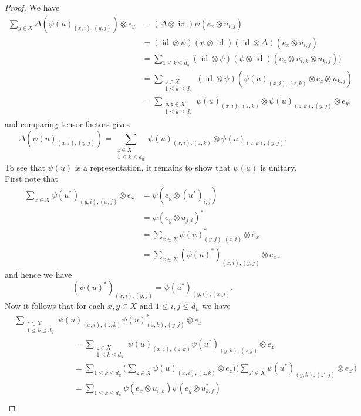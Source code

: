 \documentclass[10pt,a4paper]{amsart}
\def\id{\operatorname{id}}
\begin{document}
\begin{proof}
	We have
	\begin{align*}
		\sum_{y\in X} \Delta(\psi(u)_{(x,i),(y,j)}) \otimes e_y &= (\Delta\otimes\id)\psi(e_x\otimes u_{i,j}) \\
		&= (\id\otimes\psi)(\psi\otimes\id)(\id\otimes\Delta)(e_x\otimes u_{i,j}) \\
		&= \sum_{1\le k\le d_u}(\id\otimes\psi)(\psi\otimes\id)(e_x\otimes u_{i,k}\otimes u_{k,j})) \\
		&= \sum_{\substack{z\in X\\ 1\le k\le d_u}} (\id\otimes\psi)(\psi(u)_{(x,i),(z,k)}\otimes e_z \otimes u_{k,j}) \\
		&= \sum_{\substack{y,z\in X\\ 1\le k\le d_u}}\psi(u)_{(x,i),(z,k)} \otimes \psi(u)_{(z,k),(y,j)} \otimes e_y,
	\end{align*}
	and comparing tensor factors gives 
	\[
	\Delta(\psi(u)_{(x,i),(y,j)}) = \sum_{\substack{z\in X\\ 1\le k\le d_u}} \psi(u)_{(x,i),(z,k)} \otimes \psi(u)_{(z,k),(y,j)}.
	\]
	To see that $\psi(u)$ is a representation, it remains to show that $\psi(u)$ is unitary. First note that 
	\begin{align*}
		\sum_{x\in X}\psi(u^*)_{(y,i),(x,j)}\otimes e_x &= \psi(e_y\otimes (u^*)_{i,j})\\
		&=\psi(e_y\otimes u_{j,i})^*\\
		&=\sum_{x\in X}\psi(u)_{(y,j),(x,i)}^*\otimes e_x\\
		&=\sum_{x\in X}(\psi(u)^*)_{(x,i),(y,j)}\otimes e_x,
	\end{align*}
	and hence we have 
	\[
	(\psi(u)^*)_{(x,i),(y,j)}=\psi(u^*)_{(y,i),(x,j)}.
	\]
	Now it follows that for each $x,y\in X$ and $1\le i,j\le d_u$ we have
	\begin{align*}
		&\sum_{\substack{z\in X\\ 1\le k\le d_u}}\psi(u)_{(x,i),(z,k)}\psi(u)_{(z,k),(y,j)}^*\otimes e_z\\
		&\hspace{3cm}= \sum_{\substack{z\in X\\ 1\le k\le d_u}}\psi(u)_{(x,i),(z,k)}\psi(u^*)_{(y,k),(z,j)}\otimes e_z\\
		&\hspace{3cm}= \sum_{1\le k\le d_u}\Big(\sum_{z\in X}\psi(u)_{(x,i),(z,k)}\otimes e_z\Big)\Big(\sum_{z'\in X}\psi(u^*)_{(y,k),(z',j)}\otimes e_{z'}\Big)\\
		&\hspace{3cm}=\sum_{1\le k\le d_u}\psi(e_x\otimes u_{i,k})\psi(e_y\otimes u_{k,j}^*)\\

\end{align*}
\end{proof}
\end{document}
